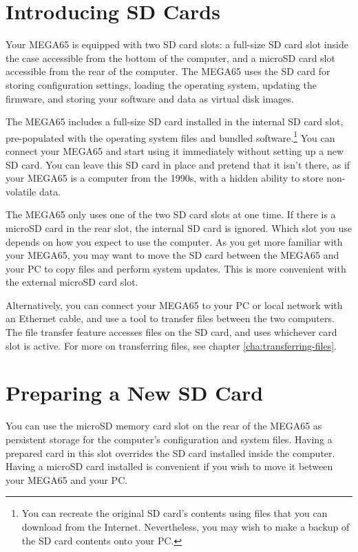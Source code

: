 \section{Introducing SD Cards}
\label{sec:introducing-sd-cards}
\nopagebreak
Your MEGA65 is equipped with two SD card slots: a full-size SD card slot inside the case accessible from the bottom of the computer, and a microSD card slot accessible from the rear of the computer. The MEGA65 uses the SD card for storing configuration settings, loading the operating system, updating the firmware, and storing your software and data as virtual disk images.

The MEGA65 includes a full-size SD card installed in the internal SD card slot, pre-populated with the operating system files and bundled software.\footnote{You can recreate the original SD card's contents using files that you can download from the Internet. Nevertheless, you may wish to make a backup of the SD card contents onto your PC.} You can connect your MEGA65 and start using it immediately without setting up a new SD card. You can leave this SD card in place and pretend that it isn't there, as if your MEGA65 is a computer from the 1990s, with a hidden ability to store non-volatile data.

The MEGA65 only uses one of the two SD card slots at one time. If there is a microSD card in the rear slot, the internal SD card is ignored. Which slot you use depends on how you expect to use the computer. As you get more familiar with your MEGA65, you may want to move the SD card between the MEGA65 and your PC to copy files and perform system updates. This is more convenient with the external microSD card slot.

Alternatively, you can connect your MEGA65 to your PC or local network with an Ethernet cable, and use a tool to transfer files between the two computers. The file transfer feature accesses files on the SD card, and uses whichever card slot is active. For more on transferring files, see chapter \vref{cha:transferring-files}.

\section{Preparing a New SD Card}

You can use the microSD memory card slot on the rear of the MEGA65 as persistent storage for the computer's configuration and system files. Having a prepared card in this slot overrides the SD card installed inside the computer. Having a microSD card installed is convenient if you wish to move it between your MEGA65 and your PC.

